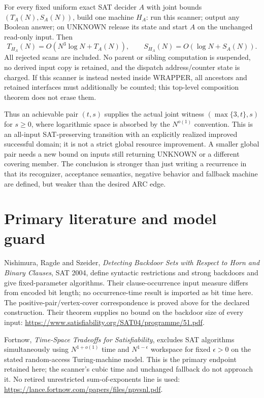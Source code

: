\documentclass[11pt]{article}
\begin{document}
For every fixed uniform exact SAT decider $A$ with joint bounds $(T_A(N),S_A(N))$, build one machine $H_A$: run this scanner; output any Boolean answer; on UNKNOWN release its state and start $A$ on the unchanged read-only input. Then
\[
 T_{H_A}(N)=O(N^3\log N+T_A(N)),\qquad
 S_{H_A}(N)=O(\log N+S_A(N)).
\]
All rejected scans are included. No parent or sibling computation is suspended, no derived input copy is retained, and the dispatch address/counter state is charged. If this scanner is instead nested inside WRAPPER, all ancestors and retained interfaces must additionally be counted; this top-level composition theorem does not erase them.

Thus an achievable pair $(t,s)$ supplies the actual joint witness
$(\max\{3,t\},s)$ for $s\ge0$, where logarithmic space is absorbed by the $N^{o(1)}$ convention. This is an all-input SAT-preserving transition with an explicitly realized improved successful domain; it is not a strict global resource improvement. A smaller global pair needs a new bound on inputs still returning UNKNOWN or a different covering member. The conclusion is stronger than just writing a recurrence in that its recognizer, acceptance semantics, negative behavior and fallback machine are defined, but weaker than the desired ARC edge.

\section{Primary literature and model guard}
Nishimura, Ragde and Szeider, \emph{Detecting Backdoor Sets with Respect to Horn and Binary Clauses}, SAT 2004, define syntactic restrictions and strong backdoors and give fixed-parameter algorithms. Their clause-occurrence input measure differs from encoded bit length; no occurrence-time result is imported as bit time here. The positive-pair/vertex-cover correspondence is proved above for the declared construction. Their theorem supplies no bound on the backdoor size of every input:
\url{https://www.satisfiability.org/SAT04/programme/51.pdf}.

Fortnow, \emph{Time-Space Tradeoffs for Satisfiability}, excludes SAT algorithms simultaneously using $N^{1+o(1)}$ time and $N^{1-\epsilon}$ workspace for fixed $\epsilon>0$ on the stated random-access Turing-machine model. This is the primary endpoint retained here; the scanner's cubic time and unchanged fallback do not approach it. No retired unrestricted sum-of-exponents line is used:
\url{https://lance.fortnow.com/papers/files/npvsnl.pdf}.
\end{document}

